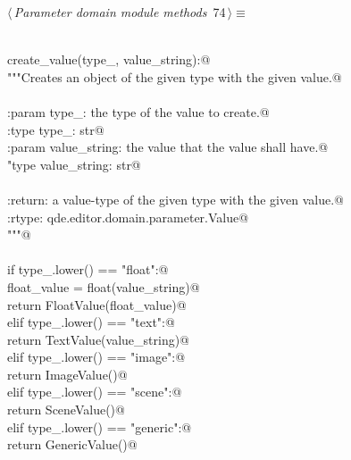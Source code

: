 \documentclass[
    a4paper,      %
    10pt,         %
    openright,    %
    notitlepage,  %
    parskip=half, %
]{scrreprt}       %
\theoremstyle{definition}                    %
\begin{document}
\begin{flushleft} \small
\begin{minipage}{\linewidth}\label{scrap119}\raggedright\small
{} $\langle\,${\itshape Parameter domain module methods}\nobreak\ {\footnotesize {74}}$\,\rangle\equiv$
\vspace{-1exm}
\begin{list}{}{} \item
\mbox{}\lstinline@@\\
\mbox{}\lstinline@def create_value(type_, value_string):@\\
\mbox{}\lstinline@    """Creates an object of the given type with the given value.@\\
\mbox{}\lstinline@@\\
\mbox{}\lstinline@    :param type_: the type of the value to create.@\\
\mbox{}\lstinline@    :type  type_: str@\\
\mbox{}\lstinline@    :param value_string: the value that the value shall have.@\\
\mbox{}\lstinline@    "type  value_string: str@\\
\mbox{}\lstinline@@\\
\mbox{}\lstinline@    :return: a value-type of the given type with the given value.@\\
\mbox{}\lstinline@    :rtype: qde.editor.domain.parameter.Value@\\
\mbox{}\lstinline@    """@\\
\mbox{}\lstinline@@\\
\mbox{}\lstinline@    if type_.lower() == "float":@\\
\mbox{}\lstinline@        float_value = float(value_string)@\\
\mbox{}\lstinline@        return FloatValue(float_value)@\\
\mbox{}\lstinline@    elif type_.lower() == "text":@\\
\mbox{}\lstinline@        return TextValue(value_string)@\\
\mbox{}\lstinline@    elif type_.lower() == "image":@\\
\mbox{}\lstinline@        return ImageValue()@\\
\mbox{}\lstinline@    elif type_.lower() == "scene":@\\
\mbox{}\lstinline@        return SceneValue()@\\
\mbox{}\lstinline@    elif type_.lower() == "generic":@\\
\mbox{}\lstinline@        return GenericValue()@\\

\end{list}
\end{minipage}
\end{flushleft}
\end{document}
